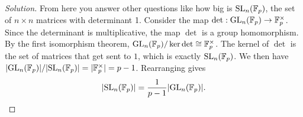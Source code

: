 \documentclass[11pt,letterpaper]{report}
\newcommand{\field}{\mathbb{F}}
\theoremstyle{definition}
\theoremstyle{remark}
\newenvironment{solution}
{\begin{proof}[Solution]}
{\end{proof}}
\begin{document}
\begin{solution}
	\noindent From here you answer other questions like how big is $\SL_n(\field_p)$, the set of $n\times n$ matrices with determinant 1. Consider the map $\det: \GL_n(\field_p)\to \field_p^\times$. Since the determinant is multiplicative, the map $\det$ is a group homomorphism. By the first isomorphism theorem, $\GL_n(\field_p)/\ker \det \cong \field_p^\times$. The kernel of $\det$ is the set of matrices that get sent to $1$, which is exactly $\SL_n(\field_p)$. We then have $|\GL_n(\field_p)|/|\SL_n(\field_p)| = |\field_p^\times| = p-1$. Rearranging gives
	\[
	|\SL_n(\field_p)| = \frac{1}{p-1}|\GL_n(\field_p)|.
	\]
\end{solution}
\end{document}
